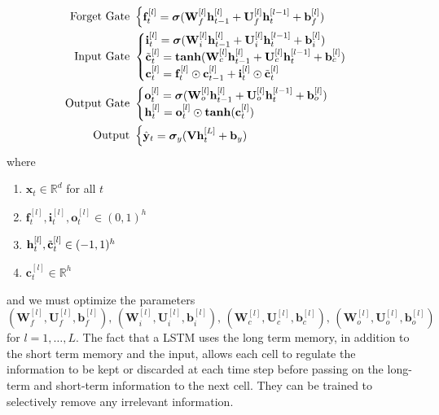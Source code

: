 \documentclass{article}
\begin{document}
      \begin{align*}
          \text{Forget Gate } & \begin{cases} \mathbf{f}_t^{[l]} = \boldsymbol{\sigma}( \mathbf{W}_f^{[l]} \mathbf{h}_{t-1}^{[l]} + \mathbf{U}_f^{[l]} \mathbf{h}_t^{[l-1]} + \mathbf{b}_f^{[l]} ) \end{cases} \\
          \text{Input Gate } & \begin{cases} \mathbf{i}_t^{[l]} = \boldsymbol{\sigma}( \mathbf{W}_i^{[l]} \mathbf{h}_{t-1}^{[l]} + \mathbf{U}_i^{[l]} \mathbf{h}_t^{[l-1]} + \mathbf{b}_i^{[l]} ) \\
              \Tilde{\mathbf{c}}_t^{[l]} = \boldsymbol{\tanh}( \mathbf{W}_c^{[l]} \mathbf{h}_{t-1}^{[l]} + \mathbf{U}_c^{[l]} \mathbf{h}_t^{[l-1]} + \mathbf{b}_c^{[l]} ) \\ 
              \mathbf{c}_t^{[l]} = \mathbf{f}_t^{[l]} \odot \mathbf{c}_{t-1}^{[l]} + \mathbf{i}_t^{[l]} \odot \Tilde{\mathbf{c}}_t^{[l]}  \end{cases} \\
              \text{Output Gate } & \begin{cases} \mathbf{o}_t^{[l]} = \boldsymbol{\sigma}( \mathbf{W}_o^{[l]} \mathbf{h}_{t-1}^{[l]} + \mathbf{U}_o^{[l]} \mathbf{h}_t^{[l-1]} + \mathbf{b}_o^{[l]} ) \\
              \mathbf{h}_t^{[l]} = \mathbf{o}_t^{[l]} \odot \boldsymbol{\tanh}(\mathbf{c}_t^{[l]})
               \end{cases} \\
               \text{Output } & \begin{cases} \hat{\mathbf{y}}_t = \boldsymbol{\sigma}_y ( \mathbf{V} \mathbf{h}_t^{[L]} + \mathbf{b}_y) \end{cases}
      \end{align*}
      where 
      \begin{enumerate}
          \item $\mathbf{x}_t \in \mathbb{R}^d$ for all $t$ 
          \item $\mathbf{f}_t^{[l]}, \mathbf{i}_t^{[l]}, \mathbf{o}_t^{[l]} \in (0, 1)^h$
          \item $\mathbf{h}_t^{[l]}, \Tilde{\mathbf{c}}_t^{[l]} \in (-1, 1)^h$
          \item $\mathbf{c}_t^{[l]} \in \mathbb{R}^h$
      \end{enumerate}
      and we must optimize the parameters 
      \[(\mathbf{W}_f^{[l]}, \mathbf{U}_f^{[l]}, \mathbf{b}_f^{[l]}), \, (\mathbf{W}_i^{[l]}, \mathbf{U}_i^{[l]}, \mathbf{b}_i^{[l]}), \, (\mathbf{W}_c^{[l]}, \mathbf{U}_c^{[l]}, \mathbf{b}_c^{[l]}), \, (\mathbf{W}_o^{[l]}, \mathbf{U}_o^{[l]}, \mathbf{b}_o^{[l]})\]
      for $l = 1, \ldots, L$. The fact that a LSTM uses the long term memory, in addition to the short term memory and the input, allows each cell to regulate the information to be kept or discarded at each time step before passing on the long-term and short-term information to the next cell. They can be trained to selectively remove any irrelevant information. 
\end{document}
